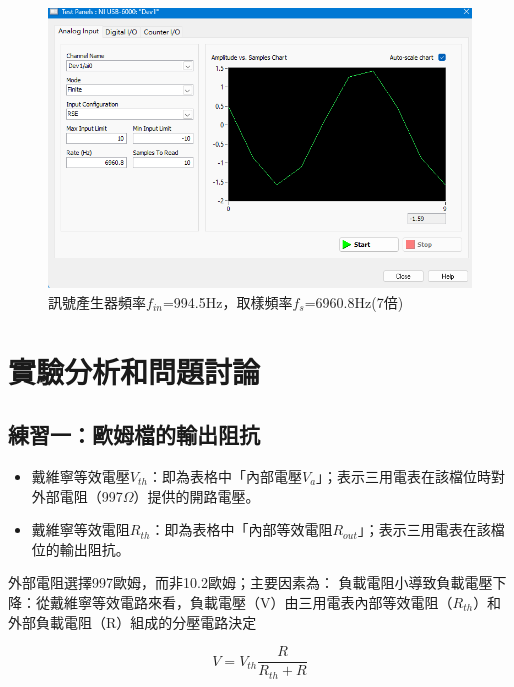 \documentclass[12pt,a4paper]{article}
\begin{document}
\begin{CJK}{UTF8}{bkai}
\begin{figure}[h]
    \centering
    \includegraphics[width=0.7\linewidth]{figures/exp_4_4_6.png}
    \caption{訊號產生器頻率$f_{in}$=994.5Hz，取樣頻率$f_{s}$=6960.8Hz(7倍)}
    \label{fig:exp_4_4_6}
\end{figure}

\clearpage
\section{實驗分析和問題討論}

\subsection{練習一：歐姆檔的輸出阻抗}
\hfill

\begin{itemize}
    \item 戴維寧等效電壓$V_{th}$：即為表格中「內部電壓$V_a$」；表示三用電表在該檔位時對外部電阻（997$\Omega$）提供的開路電壓。
    \item 戴維寧等效電阻$R_{th}$：即為表格中「內部等效電阻$R_{out}$」；表示三用電表在該檔位的輸出阻抗。
\end{itemize}

外部電阻選擇997歐姆，而非10.2歐姆；主要因素為：
負載電阻小導致負載電壓下降：從戴維寧等效電路來看，負載電壓（V）由三用電表內部等效電阻（$R_{th}$）和外部負載電阻（R）組成的分壓電路決定

\begin{equation*}
V=V_{th} \frac{R}{R_{th}+R}
\end{equation*}


\end{CJK}
\end{document}
